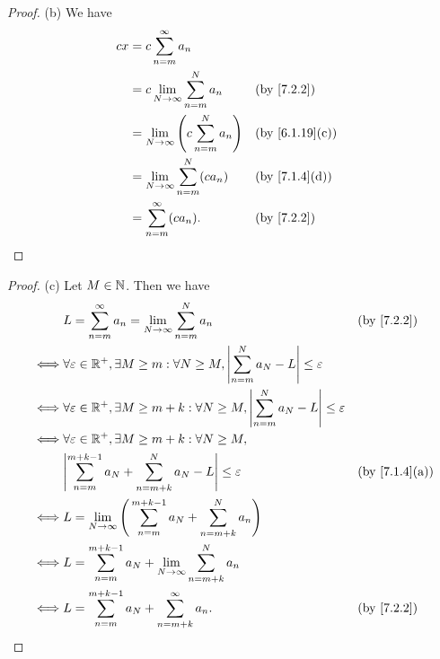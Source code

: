 \begin{proof}{(b)}
  We have
  \begin{align*}
    cx & = c \sum_{n = m}^\infty a_n                                                \\
       & = c \lim_{N \to \infty} \sum_{n = m}^N a_n             &  & \by{7.2.2}     \\
       & = \lim_{N \to \infty} \Bigg(c \sum_{n = m}^N a_n\Bigg) &  & \by{6.1.19}[c] \\
       & = \lim_{N \to \infty} \sum_{n = m}^N (c a_n)           &  & \by{7.1.4}[d]  \\
       & = \sum_{n = m}^\infty (c a_n).                         &  & \by{7.2.2}
  \end{align*}
\end{proof}

\begin{proof}{(c)}
  Let \(M \in \mathbb{N}\).
  Then we have
  \begin{align*}
         & L = \sum_{n = m}^\infty a_n = \lim_{N \to \infty} \sum_{n = m}^N a_n                                                 &  & \by{7.2.2}    \\
    \iff & \forall \varepsilon \in \R^+, \exists M \geq m : \forall N \geq M, \abs{\sum_{n = m}^N a_N - L} \leq \varepsilon                        \\
    \iff & \forall \varepsilon \in \R^+, \exists M \geq m + k : \forall N \geq M, \abs{\sum_{n = m}^N a_N - L} \leq \varepsilon                    \\
    \iff & \forall \varepsilon \in \R^+, \exists M \geq m + k : \forall N \geq M,                                                                  \\
         & \abs{\sum_{n = m}^{m + k - 1} a_N + \sum_{n = m + k}^N a_N - L} \leq \varepsilon                                     &  & \by{7.1.4}[a] \\
    \iff & L = \lim_{N \to \infty} \Bigg(\sum_{n = m}^{m + k - 1} a_N + \sum_{n = m + k}^N a_n\Bigg)                                               \\
    \iff & L = \sum_{n = m}^{m + k - 1} a_N + \lim_{N \to \infty} \sum_{n = m + k}^N a_n                                                           \\
    \iff & L = \sum_{n = m}^{m + k - 1} a_N + \sum_{n = m + k}^\infty a_n.                                                      &  & \by{7.2.2}
  \end{align*}
\end{proof}

